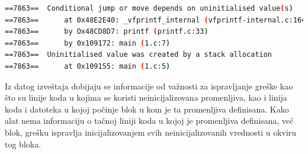 \documentclass[12pt,oneside]{memoir}
\theoremstyle{plain}
\theoremstyle{definition}
\begin{document}

\begin{lstlisting}[style=terminal,caption={Ispis greške korišćenja statičke neinicijalizovane promenljive}, label={lst:slika4.5},language={bash}]   
==7863==  Conditional jump or move depends on uninitialised value(s)
==7863==      at 0x48E2E40: _vfprintf_internal (vfprintf-internal.c:1644) 
==7863==      by Ox48CD8D7: printf (printf.c:33)
==7863==      by 0x109172: main (1.c:7)
==7863==  Uninitialised value was created by a stack allocation
==7863==      at 0x109155: main (1.c:5)
\end{lstlisting}

Iz datog izveštaja dobijaju se informacije od važnosti za ispravljanje greške kao što su linije koda u kojima se koristi neinicijalizovana promenljiva, kao i linija koda i datoteka u kojoj počinje blok u kom je ta promenljiva definisana. Kako alat nema informaciju o tačnoj liniji koda u kojoj je promenljiva definisana, već blok, grešku ispravlja inicijalizovanjem svih neinicijalizovanih vrednosti u okviru tog bloka. 
\end{document}
